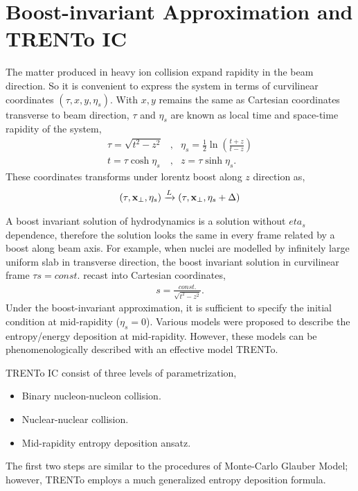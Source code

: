 \documentclass[10pt,a4paper, twocolumn]{article}
\begin{document}
\section{Boost-invariant Approximation and TRENTo IC}
	The matter produced in heavy ion collision expand rapidity in the beam direction. So it is convenient to express the system in terms of curvilinear coordinates $(\tau, x, y, \eta_s)$. 
	With $x, y$ remains the same as Cartesian coordinates transverse to beam direction, $\tau$ and $\eta_s$ are known as local time and space-time rapidity of the system,
	\begin{eqnarray}
		\tau = \sqrt{t^2 - z^2} &,& \eta_s = \frac{1}{2}\ln\left(\frac{t+z}{t-z}\right) \\
		t = \tau \cosh \eta_s &,& z = \tau \sinh \eta_s.
	\end{eqnarray}
	These coordinates transforms under lorentz boost along $z$ direction as,
	\begin{eqnarray}
		(\tau, {\bf x_{\perp}}, \eta_s) \xrightarrow{L} (\tau, {\bf x_{\perp}}, \eta_s + \Delta)
	\end{eqnarray}
	
	A boost invariant solution of hydrodynamics is a solution without $eta_s$ dependence, therefore the solution looks the same in every frame related by a boost along beam axis. 
	For example, when nuclei are modelled by infinitely large uniform slab in transverse direction, the boost invariant solution in curvilinear frame $\tau s = const.$ recast into Cartesian coordinates,
	\begin{eqnarray}
		s = \frac{const.}{\sqrt{t^2 - z^2}}.
	\end{eqnarray}
	Under the boost-invariant approximation, it is sufficient to specify the initial condition at mid-rapidity ($\eta_s = 0$). Various models were proposed to describe the entropy/energy deposition at mid-rapidity. 
	However, these models can be phenomenologically described with an effective model TRENTo.
		
	TRENTo IC consist of three levels of parametrization,
	\begin{itemize}
		\item Binary nucleon-nucleon collision.
		\item Nuclear-nuclear collision.
		\item Mid-rapidity entropy deposition ansatz.
	\end{itemize}
	The first two steps are similar to the procedures of Monte-Carlo Glauber Model; however, TRENTo employs a much generalized entropy deposition formula.
\end{document}
